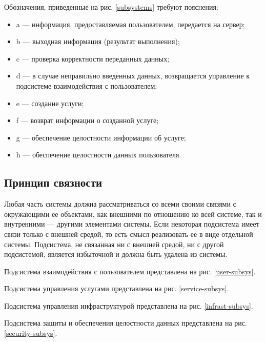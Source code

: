 Обозначения, приведенные на рис. \ref{subsystems} требуют пояснения:
\begin{itemize}[label={}]
  \item a --- информация, предоставляемая пользователем, передается на сервер;
  \item b --- выходная информация (результат выполнения);
  \item c --- проверка корректности переданных данных;
  \item d --- в случае неправильно введенных данных, возвращается управление к подсистеме взаимодействия с пользователем;
  \item e --- создание услуги;
  \item f --- возврат информации о созданной услуге;
  \item g --- обеспечение целостности информации об услуге;
  \item h --- обеспечение целостности данных пользователя.
\end{itemize}

\subsection{Принцип связности}

Любая часть системы должна рассматриваться со всеми своими связями с окружающими ее объектами, как внешними по отношению ко всей системе, так и внутренними --- другими элементами системы.
Если некоторая подсистема имеет связи только с внешней средой, то есть смысл реализовать ее в виде отдельной системы.
Подсистема, не связанная ни с внешней средой, ни с другой подсистемой, является избыточной и должна быть удалена из системы.

Подсистема взаимодействия с пользователем представлена на рис. \ref{user-subsys}.

Подсистема управления услугами представлена на рис. \ref{service-subsys}.

Подсистема управления инфраструктурой представлена на рис. \ref{infrast-subsys}.

Подсистема защиты и обеспечения целостности данных представлена на рис. \ref{security-subsys}.

